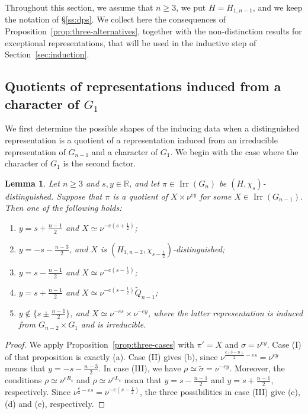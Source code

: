 \documentclass[11pt]{amsart}
\numberwithin{equation}{section}
\theoremstyle{plain}
\newtheorem{lemma}[theorem]{Lemma}
\theoremstyle{definition}
\theoremstyle{remark}
\newcommand{\R}{\mathbb{R}}
\DeclareMathOperator{\Irr}{Irr}
\newcommand{\Qt}{\widetilde{Q}}
\begin{document}
Throughout this section, we assume that $n\ge3$, we put $H=H_{1,n-1}$, and we keep the notation of \S\ref{ss:dps}. We collect here the consequences of Proposition~\ref{prop:three-alternatives}, together with the non-distinction results for exceptional representations, that will be used in the inductive step of Section~\ref{sec:induction}.

\subsection{Quotients of representations induced from a character of \texorpdfstring{$G_1$}{G1}}\label{ss:quotient-char-G1}

We first determine the possible shapes of the inducing data when a distinguished representation is a quotient of a representation induced from an irreducible representation of $G_{n-1}$ and a character of $G_1$. We begin with the case where the character of $G_1$ is the second factor.

\begin{lemma}\label{lem:quot-X-nu}
	Let $n\ge3$ and $s,y\in\R$, and let $\pi\in\Irr(G_n)$ be $(H,\chi_s)$-distinguished. Suppose that $\pi$ is a quotient of $X\times\nu^{ey}$ for some $X\in\Irr(G_{n-1})$. Then one of the following holds:
	\begin{enumerate}[label=\textup{(\alph*)}]
		\item $y=s+\frac{n-1}2$ and $X\simeq\nu^{-e(s+\frac12)}$;
		\item $y=-s-\frac{n-3}2$, and $X$ is $(H_{1,n-2},\chi_{s-\frac12})$-distinguished;
		\item $y=s-\frac{n-1}2$ and $X\simeq\nu^{-e(s-\frac12)}$;
		\item $y=s+\frac{n-1}2$ and $X\simeq\nu^{-e(s-\frac12)}\Qt_{n-1}$;
		\item $y\notin\{s\pm\frac{n-1}2\}$, and $X\simeq\nu^{-es}\times\nu^{-ey}$, where the latter representation is induced from $G_{n-2}\times G_1$ and is irreducible.
	\end{enumerate}
\end{lemma}

\begin{proof}
	We apply Proposition~\ref{prop:three-cases} with $\pi'=X$ and $\sigma=\nu^{ey}$. Case (I) of that proposition is exactly (a). Case (II) gives (b), since $\nu^{\frac{e(3-n)}2-es}=\nu^{ey}$ means that $y=-s-\frac{n-3}2$. In case (III), we have $\rho\simeq\widetilde\sigma=\nu^{-ey}$. Moreover, the conditions $\rho\simeq\nu^{eR_s}$ and $\rho\simeq\nu^{eL_s}$ mean that $y=s-\frac{n-1}2$ and $y=s+\frac{n-1}2$, respectively. Since $\nu^{\frac e2-es}=\nu^{-e(s-\frac12)}$, the three possibilities in case (III) give (c), (d) and (e), respectively.
\end{proof}
\end{document}
